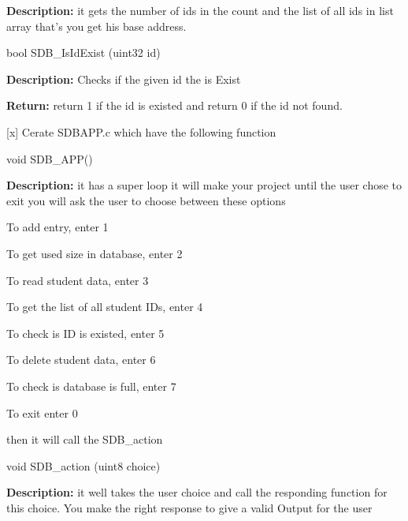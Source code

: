 \begin{DoxyItemize}
\begin{DoxyItemize}
\begin{DoxyItemize}
\item {\bfseries{Description\+:}} it gets the number of ids in the count and the list of all ids in list array that’s you get his base address.
\end{DoxyItemize}
\item {\ttfamily bool SDB\+\_\+\+Is\+Id\+Exist (uint32 id)}
\begin{DoxyItemize}
\item {\bfseries{Description\+:}} Checks if the given id the is Exist
\item {\bfseries{Return\+:}} return 1 if the id is existed and return 0 if the id not found.
\end{DoxyItemize}
\end{DoxyItemize}
\item \mbox{[}x\mbox{]} Cerate {\ttfamily SDBAPP.\+c} which have the following function
\begin{DoxyItemize}
\item {\ttfamily void SDB\+\_\+\+APP()}
\begin{DoxyItemize}
\item {\bfseries{Description\+:}} it has a super loop it will make your project until the user chose to exit you will ask the user to choose between these options
\end{DoxyItemize}
\begin{DoxyEnumerate}
\item To add entry, enter 1
\item To get used size in database, enter 2
\item To read student data, enter 3
\item To get the list of all student IDs, enter 4
\item To check is ID is existed, enter 5
\item To delete student data, enter 6
\item To check is database is full, enter 7
\item To exit enter 0
\end{DoxyEnumerate}
\item then it will call the {\ttfamily SDB\+\_\+action}
\begin{DoxyItemize}
\item {\ttfamily void SDB\+\_\+action (uint8 choice)}
\begin{DoxyItemize}
\item {\bfseries{Description\+:}} it well takes the user choice and call the responding function for this choice. You make the right response to give a valid Output for the user

\end{DoxyItemize}
\end{DoxyItemize}
\end{DoxyItemize}
\end{DoxyItemize}
